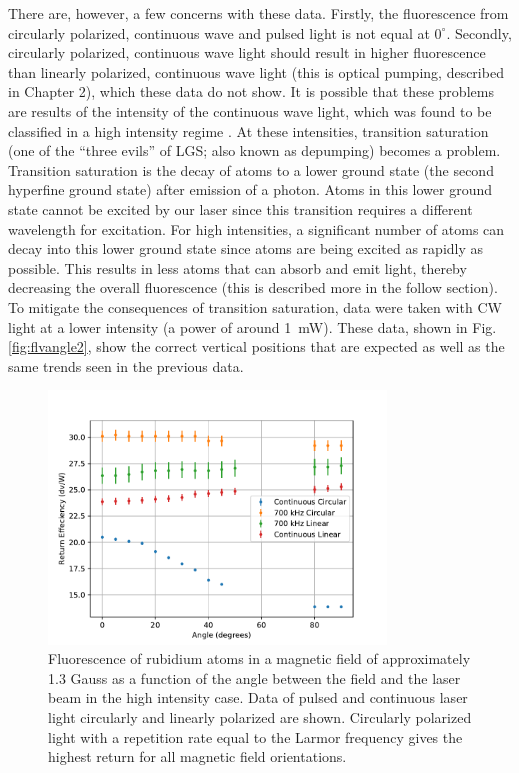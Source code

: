 There are, however, a few concerns with these data. Firstly, the fluorescence from circularly polarized, continuous wave and pulsed light is not equal at $0^{\circ}$. Secondly, circularly polarized, continuous wave light should result in higher fluorescence than linearly polarized, continuous wave light (this is optical pumping, described in Chapter 2), which these data do not show. It is possible that these problems are results of the intensity of the continuous wave light, which was found to be classified in a high intensity regime \cite{Kane2014}. At these intensities, transition saturation (one of the ``three evils'' of LGS; also known as depumping) becomes a  problem. Transition saturation is the decay of atoms to a lower ground state (the second hyperfine ground state) after emission of a photon. Atoms in this lower ground state cannot be excited by our laser since this transition requires a different wavelength for excitation. For high intensities, a significant number of atoms can decay into this lower ground state since atoms are being excited as rapidly as possible. This results in less atoms that can absorb and emit light, thereby decreasing the overall fluorescence (this is described more in the follow section). To mitigate the consequences of transition saturation, data were taken with CW light at a lower intensity (a power of around \SI{1}{\milli \watt}). These data, shown in Fig. \ref{fig:flvangle2}, show the correct vertical positions that are expected as well as the same trends seen in the previous data. 


\begin{figure}[htb]
	\centering
	\includegraphics[width=0.8\textwidth]{../../MRPData/MAR24/together.pdf}
	\caption{Fluorescence of rubidium atoms in a magnetic field of approximately 1.3 Gauss as a function of the angle between the field and the laser beam in the high intensity case. Data of pulsed and continuous laser light circularly and linearly polarized are shown. Circularly polarized light with a repetition rate equal to the Larmor frequency gives the highest return for all magnetic field orientations.}
	\label{fig:flvangle}
\end{figure}

